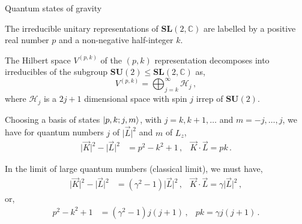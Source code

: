 \documentclass[12pt,titlepage]{article}
\begin{document}
\begin{frame}{Quantum states of gravity}
    \begin{list}{\,}{\leftmargin=1em \itemindent=0em}
        \item<1-> The irreducible unitary representations of $\mathbf{SL}(2,\mathbb{C})$ are labelled by a positive real number $p$ and a non-negative half-integer $k$.
        \item<2-> The Hilbert space $V^{(p,k)}$ of the $(p,k)$ representation decomposes into irreducibles of the subgroup $\mathbf{SU}(2)\leq\mathbf{SL}(2,\mathbb{C})$ as,
        \begin{equation}
            V^{(p,k)}=\bigoplus^\infty_{j=k}\mathcal{H}_j\,,
        \end{equation}
        where $\mathcal{H}_j$ is a $2j+1$ dimensional space with spin $j$ irrep of $\mathbf{SU}(2)$.
        \item<3-> Choosing a basis of states $\ket{p,k;j,m}$, with $j=k,k+1,\dots$ and $m=-j,\dots,j$, we have for quantum numbers $j$ of $\lvert\vec{L}\rvert^2$ and $m$ of $L_z$,
        \begin{align}
            \lvert\vec{K}\rvert^2-\lvert\vec{L}\rvert^2 &= p^2-k^2+1\,, &\vec{K}\cdot\vec{L}=pk\,.
        \end{align}
        \item<4-> In the limit of large quantum numbers (classical limit), we must have,
        \begin{align}
            \lvert\vec{K}\rvert^2-\lvert\vec{L}\rvert^2 &= (\gamma^2-1) \lvert\vec{L}\rvert^2 \,, &\vec{K}\cdot\vec{L}=\gamma \lvert\vec{L}\rvert^2\,,
        \end{align}
        or,
        \begin{align}
            p^2-k^2+1 &=(\gamma^2-1)j(j+1)\,, &pk=\gamma j(j+1)\,.
        \end{align}
    \end{list}
\end{frame}
\end{document}
